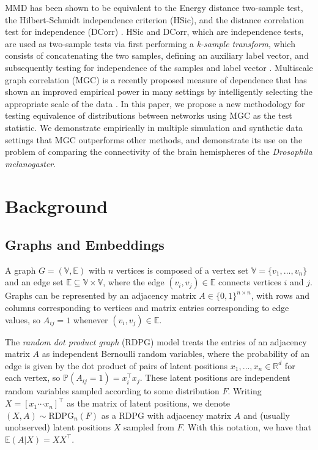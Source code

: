 MMD has been shown to be equivalent to the Energy distance two-sample test, the Hilbert-Schmidt independence
criterion (HSic), and the distance correlation test for independence (DCorr) \cite{exact-equivalence-1, exact-equivalence-2}. 
HSic and DCorr, which are independence tests, are used as two-sample tests via first performing a \textit{k-sample transform}, which consists of concatenating the two samples, defining an auxiliary label vector, and subsequently testing for independence of the samples and label vector \cite{exact-equivalence-2}.
Multiscale graph correlation (MGC) is a recently proposed measure of dependence that
has shown an improved empirical power in many settings by intelligently selecting the appropriate
scale of the data \cite{mgc-0, mgc-1, mgc-2}. In this paper, we propose a new methodology for testing equivalence of distributions between networks using MGC as the test statistic. We demonstrate empirically in multiple simulation and synthetic data settings that
MGC outperforms other methods, and demonstrate its use on the problem of comparing the connectivity of the brain hemispheres of the \textit{Drosophila melanogaster}.

\section{Background}\label{sec:background}
\subsection{Graphs and Embeddings}
A graph $G = (\mathbb{V}, \mathbb{E})$ with $n$ vertices is composed of a vertex set $\mathbb{V} = \{v_1, \dots, v_n\}$ and an edge set $\mathbb{E} \subseteq \mathbb{V} \times \mathbb{V}$, where the edge $(v_i,v_j)\in\mathbb{E}$ connects vertices $i$ and $j$. Graphs can be represented by an adjacency matrix $A\in\{0,1\}^{n\times n}$, with rows and columns corresponding to vertices and matrix entries corresponding to edge values, so $A_{ij}=1$ whenever $(v_i,v_j)\in\mathbb{E}$.

The \textit{random dot product graph} (RDPG) model \cite{athreya2018rdpg} treats the entries of an adjacency matrix $A$ as independent Bernoulli random variables, where the probability of an edge is given by the dot product of pairs of latent positions $x_1,\ldots, x_n\in\mathbb{R}^d$ for each vertex, so $\mathbb{P}(A_{ij}=1) = x_i^\top x_j$. These latent positions are independent random variables sampled according to some distribution $F$. Writing $X = \left[x_1 \cdots x_n\right]^\top$ as the matrix of latent positions, we denote $(X,A)\sim\text{RDPG}_n(F)$ as a RDPG with adjacency matrix $A$ and (usually unobserved) latent positions $X$ sampled from $F$. With this notation, we have that $\mathbb{E}(A|X) = XX^{\top}$. 

